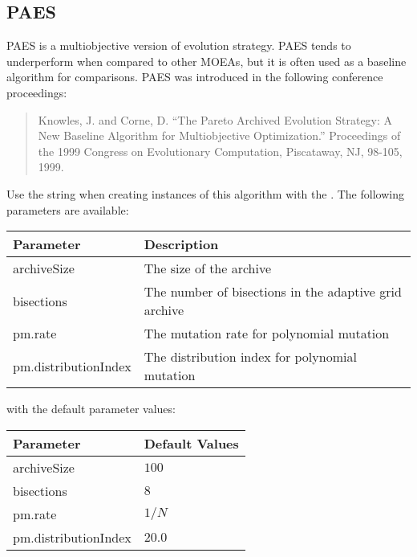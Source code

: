 \subsection{PAES}
PAES is a multiobjective version of evolution strategy.  PAES tends to underperform when compared to other MOEAs, but it is often used as a baseline algorithm for comparisons.  PAES was introduced in the following conference proceedings:
\begin{quote}
Knowles, J. and Corne, D.  ``The Pareto Archived Evolution Strategy: A New Baseline Algorithm for Multiobjective Optimization.''  Proceedings of the 1999 Congress on Evolutionary Computation, Piscataway, NJ, 98-105, 1999.
\end{quote}
Use the string  when creating instances of this algorithm with the .  The following parameters are available:
\newline
\newline
\begin{tabularx}{\linewidth}{lX}
  \hline
  Parameter & Description \\
  \hline
  archiveSize & The size of the archive \\
  bisections & The number of bisections in the adaptive grid archive \\
  pm.rate & The mutation rate for polynomial mutation \\
  pm.distributionIndex & The distribution index for polynomial mutation \\
  \hline
\end{tabularx}
\newline
\newline
with the default parameter values:
\newline
\newline
\begin{tabularx}{\linewidth}{lX}
  \hline
  Parameter & Default Values \\
  \hline
  archiveSize & $100$ \\
  bisections & $8$ \\
  pm.rate & $1/N$ \\
  pm.distributionIndex & $20.0$ \\
  \hline
\end{tabularx}

